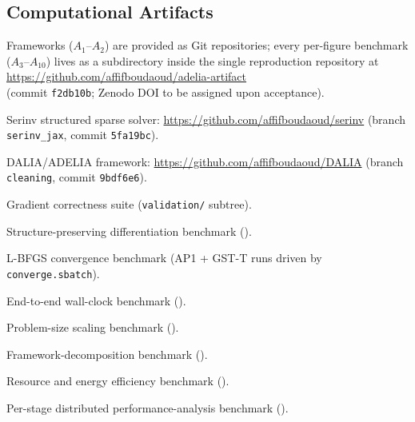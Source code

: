 \documentclass[nonacm,sigconf]{acmart}
\begin{document}
\subsection{Computational Artifacts}

Frameworks ($A_1$--$A_2$) are provided as Git repositories; every
per-figure benchmark ($A_3$--$A_{10}$) lives as a subdirectory inside
the single reproduction repository at\\
\url{https://github.com/affifboudaoud/adelia-artifact}\\
(commit \texttt{f2db10b}; Zenodo DOI to be assigned upon acceptance).

\begin{description}[leftmargin=2.5em,labelindent=0pt,itemsep=3pt,topsep=3pt]
\item[$A_1$] Serinv structured sparse solver:
  \url{https://github.com/affifboudaoud/serinv}
  (branch \texttt{serinv\_jax}, commit \texttt{5fa19bc}).
\item[$A_2$] DALIA/ADELIA framework:
  \url{https://github.com/affifboudaoud/DALIA}
  (branch \texttt{cleaning}, commit \texttt{9bdf6e6}).
\item[$A_3$] Gradient correctness suite
  (\texttt{validation/} subtree).
\item[$A_4$] Structure-preserving differentiation benchmark
  ().
\item[$A_5$] L-BFGS convergence benchmark
  (AP1 + GST-T runs driven by \texttt{converge.sbatch}).
\item[$A_6$] End-to-end wall-clock benchmark
  ().
\item[$A_7$] Problem-size scaling benchmark
  ().
\item[$A_8$] Framework-decomposition benchmark
  ().
\item[$A_9$] Resource and energy efficiency benchmark
  ().
\item[$A_{10}$] Per-stage distributed performance-analysis benchmark
  ().
\end{description}
\end{document}
